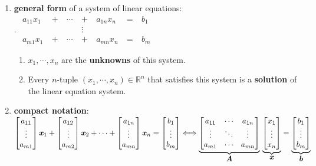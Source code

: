 \begin{enumerate}
    \item \textbf{general form} of a system of linear equations:
    \\
    .\hfill
    $
        \begin{aligned}
            a_{11}x_1\  & +\ & \cdots\ & +\ & a_{1n}x_n\ & =\ & b_1 \\
            & & & \vdots \\
            a_{m1}x_1\  & +\ & \cdots\ & +\ & a_{mn}x_n\ & =\ & b_m
        \end{aligned}
    $
    \hfill \cite{mfml/book/mml/Deisenroth-Faisal-Ong}
    \vspace{0.2cm}
    \begin{enumerate}
        \item $x_1, \cdots , x_n$ are the \textbf{unknowns} of this system.

        \item Every $n$-tuple $(x_1, \cdots , x_n) \in \mathbb{R}^n$ that satisfies this system is a \textbf{solution} of the linear equation system.
    \end{enumerate}


    \item \textbf{compact notation}:
    \\[0.2cm]
    $
        \begin{bmatrix}a_{11}\\ \vdots\\ a_{m1}\end{bmatrix} \text{\textbf{\textit{x}}}_1 +
        \begin{bmatrix}a_{12}\\ \vdots\\ a_{m2}\end{bmatrix} \text{\textbf{\textit{x}}}_2 +
        \cdots +
        \begin{bmatrix}a_{1n}\\ \vdots\\ a_{mn}\end{bmatrix} \text{\textbf{\textit{x}}}_n =
        \begin{bmatrix}b_{1}\\ \vdots\\ b_{m}\end{bmatrix}
    \Longleftrightarrow
        \underset{\displaystyle\text{\textbf{\textit{A}}}}{\underbrace{\begin{bmatrix}
            a_{11} & \cdots & a_{1n} \\
            \vdots & \ddots & \vdots \\
            a_{m1} & \cdots & a_{mn}
        \end{bmatrix}}} \
        \underset{\displaystyle\text{\textbf{\textit{x}}}}{\underbrace{\begin{bmatrix} x_{1} \\ \vdots \\ x_{n} \end{bmatrix}}}
        =
        \underset{\displaystyle\text{\textbf{\textit{b}}}}{\underbrace{\begin{bmatrix} b_{1} \\ \vdots \\ b_{m} \end{bmatrix}}}
    $
    \hfill \cite{mfml/book/mml/Deisenroth-Faisal-Ong}


\end{enumerate}

